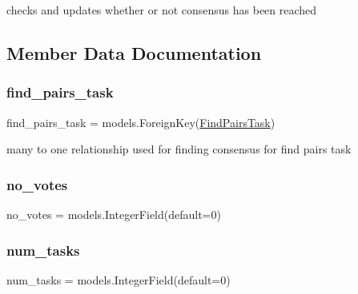 checks and updates whether or not consensus has been reached 



\subsection{Member Data Documentation}
\mbox{\label{classjoinapp_1_1models_1_1task__management__models_1_1_join_pair_task_a257eaf9cfc95b681d5574cd26f284554}} 
\subsubsection{\texorpdfstring{find\_pairs\_task}{find\_pairs\_task}}
{\footnotesize\ttfamily find\+\_\+pairs\+\_\+task = models.\+Foreign\+Key(\mbox{\hyperlink{classjoinapp_1_1models_1_1task__management__models_1_1_find_pairs_task}{Find\+Pairs\+Task}})\hspace{0.3cm}{\ttfamily [static]}}



many to one relationship used for finding consensus for find pairs task 

\mbox{\label{classjoinapp_1_1models_1_1task__management__models_1_1_join_pair_task_a1e1b32e1e9767af8d38c4e2de888919f}} 
\subsubsection{\texorpdfstring{no\_votes}{no\_votes}}
{\footnotesize\ttfamily no\+\_\+votes = models.\+Integer\+Field(default=0)\hspace{0.3cm}{\ttfamily [static]}}

\mbox{\label{classjoinapp_1_1models_1_1task__management__models_1_1_join_pair_task_afc259a6f918180e978f96108b03d3411}} 
\subsubsection{\texorpdfstring{num\_tasks}{num\_tasks}}
{\footnotesize\ttfamily num\+\_\+tasks = models.\+Integer\+Field(default=0)\hspace{0.3cm}{\ttfamily [static]}}



